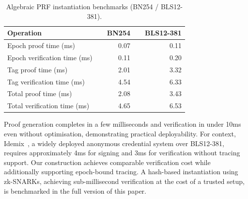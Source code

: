 \begin{table}[t] \centering \caption{Algebraic PRF instantiation benchmarks
  (BN254 / BLS12-381).} \label{tab:algebraic} \begin{tabular}{l r r} \toprule
    Operation & \ \ BN254 & \ \ BLS12-381 \\ \midrule Epoch proof time (ms)
              & 0.07 & 0.11 \\ Epoch verification time (ms) & 0.11 & 0.20 \\
    Tag proof time (ms)          & 2.01 & 3.32 \\ Tag verification time (ms)
                                 & 4.54 & 6.33 \\ \midrule Total proof time
    (ms)        & 2.08 & 3.43 \\ Total verification time (ms) & 4.65 & 6.53 \\
  \bottomrule \end{tabular} \end{table}

  Proof generation completes in a few milliseconds and verification in under
  10ms even without optimisation, demonstrating practical deployability.  For
  context, Idemix~\cite{CCS:CamVan02}, a widely deployed anonymous credential
  system over BLS12-381, requires approximately 4ms for signing and 3ms for
  verification without tracing support. Our construction achieves comparable
  verification cost while additionally supporting epoch-bound tracing. A
  hash-based instantiation using zk-SNARKs, achieving sub-millisecond
  verification at the cost of a trusted setup, is benchmarked in the full
  version of this paper.
